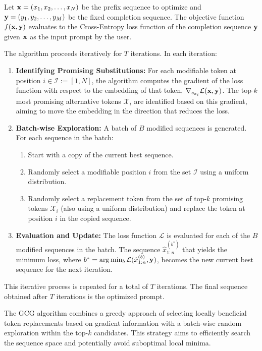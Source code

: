 \documentclass[../thesis.tex]{subfiles}
\begin{document}
Let $\mathbf{x} = (x_1, x_2, \dots, x_N)$ be the prefix sequence to optimize and $\mathbf{y} = (y_1, y_2, \dots, y_M)$ be the fixed completion sequence. The objective function $f(\mathbf{x}, \mathbf{y})$ evaluates to the Cross-Entropy loss function of the completion sequence $\mathbf{y}$ given $\mathbf{x}$ as the input prompt by the user.

The algorithm proceeds iteratively for $T$ iterations. In each iteration:

\begin{enumerate}
    \item \textbf{Identifying Promising Substitutions:}
    For each modifiable token at position $i \in \mathcal{I} := [1, N]$, the algorithm computes the gradient of the loss function with respect to the embedding of that token, $\nabla_{e_{x_i}} \mathcal{L}(\mathbf{x}, \mathbf{y})$. The top-$k$ most promising alternative tokens $\mathcal{X}_i$ are identified based on this gradient, aiming to move the embedding in the direction that reduces the loss.

    \item \textbf{Batch-wise Exploration:}
    A batch of $B$ modified sequences is generated. For each sequence in the batch:
    \begin{enumerate}
        \item Start with a copy of the current best sequence.
        \item Randomly select a modifiable position $i$ from the set $\mathcal{I}$ using a uniform distribution.
        \item Randomly select a replacement token from the set of top-$k$ promising tokens $\mathcal{X}_i$ (also using a uniform distribution) and replace the token at position $i$ in the copied sequence.
    \end{enumerate}

    \item \textbf{Evaluation and Update:}
    The loss function $\mathcal{L}$ is evaluated for each of the $B$ modified sequences in the batch.
    The sequence $\hat{x}_{1:n}^{(b^*)}$ that yields the minimum loss, where $b^* = \arg\min_{b} \mathcal{L}(\hat{x}_{1:n}^{(b)}, \mathbf{y})$, becomes the new current best sequence for the next iteration.
\end{enumerate}

This iterative process is repeated for a total of $T$ iterations. The final sequence obtained after $T$ iterations is the optimized prompt.

The GCG algorithm combines a greedy approach of selecting locally beneficial token replacements based on gradient information with a batch-wise random exploration within the top-$k$ candidates. This strategy aims to efficiently search the sequence space and potentially avoid suboptimal local minima.
\end{document}

